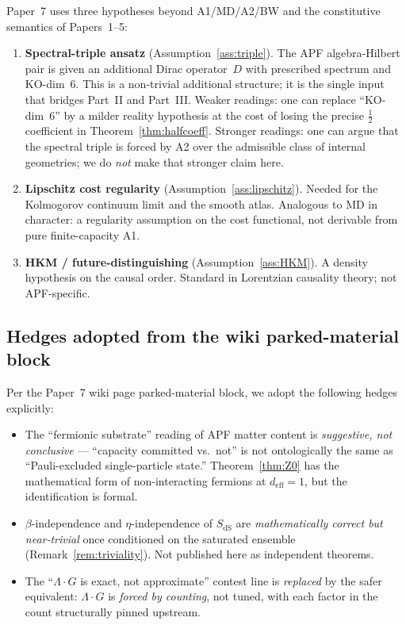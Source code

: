 \documentclass[11pt,a4paper]{article}
\theoremstyle{definition}
\newcommand{\deff}{d_{\mathrm{eff}}}
\begin{document}
Paper~7 uses three hypotheses beyond A1/MD/A2/BW and the constitutive semantics of Papers~1--5:
\begin{enumerate}[label=(H\arabic*),leftmargin=*]
\item \textbf{Spectral-triple ansatz} (Assumption~\ref{ass:triple}).  The APF algebra-Hilbert pair is given an additional Dirac operator~$D$ with prescribed spectrum and KO-dim~6.  This is a non-trivial additional structure; it is the single input that bridges Part~II and Part~III.  Weaker readings: one can replace ``KO-dim~6'' by a milder reality hypothesis at the cost of losing the precise $\tfrac12$ coefficient in Theorem~\ref{thm:halfcoeff}.  Stronger readings: one can argue that the spectral triple is forced by A2 over the admissible class of internal geometries; we do \emph{not} make that stronger claim here.
\item \textbf{Lipschitz cost regularity} (Assumption~\ref{ass:lipschitz}).  Needed for the Kolmogorov continuum limit and the smooth atlas.  Analogous to MD in character: a regularity assumption on the cost functional, not derivable from pure finite-capacity A1.
\item \textbf{HKM / future-distinguishing} (Assumption~\ref{ass:HKM}).  A density hypothesis on the causal order.  Standard in Lorentzian causality theory; not APF-specific.
\end{enumerate}

\subsection{Hedges adopted from the wiki parked-material block}

Per the Paper~7 wiki page parked-material block, we adopt the following hedges explicitly:
\begin{itemize}[leftmargin=*]
\item The ``fermionic substrate'' reading of APF matter content is \emph{suggestive, not conclusive} --- ``capacity committed vs.\ not'' is not ontologically the same as ``Pauli-excluded single-particle state.''  Theorem~\ref{thm:Z0} has the mathematical form of non-interacting fermions at $\deff=1$, but the identification is formal.
\item $\beta$-independence and $\eta$-independence of $S_{\mathrm{dS}}$ are \emph{mathematically correct but near-trivial} once conditioned on the saturated ensemble (Remark~\ref{rem:triviality}).  Not published here as independent theorems.
\item The ``$\Lambda\cdot G$ is exact, not approximate'' contest line is \emph{replaced} by the safer equivalent: $\Lambda\cdot G$ is \emph{forced by counting}, not tuned, with each factor in the count structurally pinned upstream.
\end{itemize}
\end{document}
